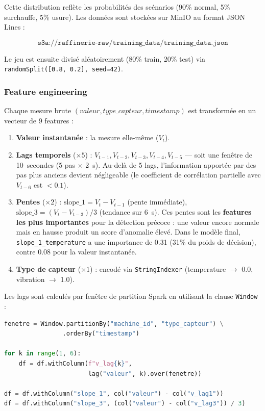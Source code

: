 \documentclass[12pt,a4paper]{article}
\begin{document}
Cette distribution reflète les probabilités des scénarios (90\% normal, 5\% surchauffe, 5\% usure). Les données sont stockées sur MinIO au format JSON Lines :

\[
\texttt{s3a://raffinerie-raw/training\_data/training\_data.json}
\]

Le jeu est ensuite divisé aléatoirement (80\% train, 20\% test) via \texttt{randomSplit([0.8, 0.2], seed=42)}.

\subsubsection{Feature engineering}

Chaque mesure brute $(valeur, type\_capteur, timestamp)$ est transformée en un vecteur de 9 features :

\begin{enumerate}
    \item \textbf{Valeur instantanée} : la mesure elle-même ($V_t$).
    \item \textbf{Lags temporels} ($\times 5$) : $V_{t-1}, V_{t-2}, V_{t-3}, V_{t-4}, V_{t-5}$ — soit une fenêtre de 10~secondes (5 pas $\times$ 2~s). Au-delà de 5 lags, l'information apportée par des pas plus anciens devient négligeable (le coefficient de corrélation partielle avec $V_{t-6}$ est $<0.1$).
    \item \textbf{Pentes} ($\times 2$) : $\text{slope\_1} = V_t - V_{t-1}$ (pente immédiate), $\text{slope\_3} = (V_t - V_{t-3}) / 3$ (tendance sur 6~s). Ces pentes sont les \textbf{features les plus importantes} pour la détection précoce : une valeur encore normale mais en hausse produit un score d'anomalie élevé. Dans le modèle final, \texttt{slope\_1\_temperature} a une importance de 0.31 (31\% du poids de décision), contre 0.08 pour la valeur instantanée.
    \item \textbf{Type de capteur} ($\times 1$) : encodé via \texttt{StringIndexer} (temperature $\rightarrow$ 0.0, vibration $\rightarrow$ 1.0).
\end{enumerate}

Les lags sont calculés par fenêtre de partition Spark en utilisant la clause \texttt{Window} :

\begin{lstlisting}[language=Python,caption={Calcul des lags et pentes dans Spark}]
fenetre = Window.partitionBy("machine_id", "type_capteur") \
                .orderBy("timestamp")

for k in range(1, 6):
    df = df.withColumn(f"v_lag{k}",
                       lag("valeur", k).over(fenetre))

df = df.withColumn("slope_1", col("valeur") - col("v_lag1"))
df = df.withColumn("slope_3", (col("valeur") - col("v_lag3")) / 3)
\end{lstlisting}
\end{document}
